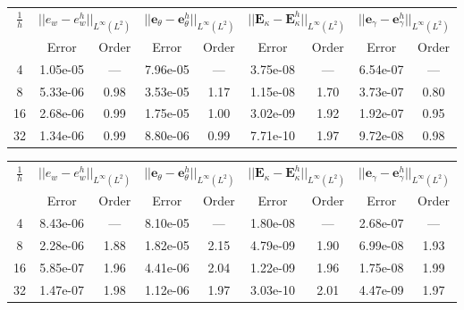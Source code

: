 \begin{table}[hp]
	\centering
	\begin{tabular}{ccccccccc}
		\hline 
		\multirow{2}{*}{$\frac{1}{h}$} & \multicolumn{2}{c}{$||e_w - e_w^h||_{L^{\infty}(L^2)}$}    & \multicolumn{2}{c}{$||\bm{e}_\theta - \bm{e}_\theta^h||_{L^{\infty}(L^2)}$} & \multicolumn{2}{c}{$||\bm{E}_\kappa - \bm{E}_\kappa^h||_{L^{\infty}(L^2)}$} & \multicolumn{2}{c}{$||\bm{e}_\gamma - \bm{e}_\gamma^ h||_{L^{\infty}(L^2)}$}   \\ 
		& Error & Order  & Error & Order  & Error & Order  & Error & Order   \\ 
		\hline 
		4  & 1.05e-05 & ---  & 7.96e-05 & ---  & 3.75e-08 & ---  & 6.54e-07 & --- \\ 
		8  & 5.33e-06 & 0.98 & 3.53e-05 & 1.17 & 1.15e-08 & 1.70 & 3.73e-07 & 0.80\\ 
		16 & 2.68e-06 & 0.99 & 1.75e-05 & 1.00 & 3.02e-09 & 1.92 & 1.92e-07 & 0.95\\ 
		32 & 1.34e-06 & 0.99 & 8.80e-06 & 0.99 & 7.71e-10 & 1.97 & 9.72e-08 & 0.98\\ 
		\hline 
	\end{tabular} 
	\captionsetup{width=0.95\linewidth}
	\vspace{1mm}
	\label{tab:resminAFW_k1}
\end{table}

\begin{table}[hp]
	\centering
	\begin{tabular}{ccccccccc}
		\hline 
		\multirow{2}{*}{$\frac{1}{h}$} & \multicolumn{2}{c}{$||e_w - e_w^h||_{L^{\infty}(L^2)}$}    & \multicolumn{2}{c}{$||\bm{e}_\theta - \bm{e}_\theta^h||_{L^{\infty}(L^2)}$} & \multicolumn{2}{c}{$||\bm{E}_\kappa - \bm{E}_\kappa^h||_{L^{\infty}(L^2)}$} & \multicolumn{2}{c}{$||\bm{e}_\gamma - \bm{e}_\gamma^ h||_{L^{\infty}(L^2)}$}   \\ 
		& Error & Order  & Error & Order  & Error & Order  & Error & Order   \\ 
		\hline 
		4  & 8.43e-06 & ---  & 8.10e-05 & ---  & 1.80e-08 & ---  & 2.68e-07 & --- \\ 
		8  & 2.28e-06 & 1.88 & 1.82e-05 & 2.15 & 4.79e-09 & 1.90 & 6.99e-08 & 1.93\\ 
		16 & 5.85e-07 & 1.96 & 4.41e-06 & 2.04 & 1.22e-09 & 1.96 & 1.75e-08 & 1.99\\ 
		32 & 1.47e-07 & 1.98 & 1.12e-06 & 1.97 & 3.03e-10 & 2.01 & 4.47e-09 & 1.97\\ 
		\hline 
	\end{tabular} 
	\captionsetup{width=0.95\linewidth}
	\vspace{1mm}
	\label{tab:resminAFW_k2}
\end{table}

